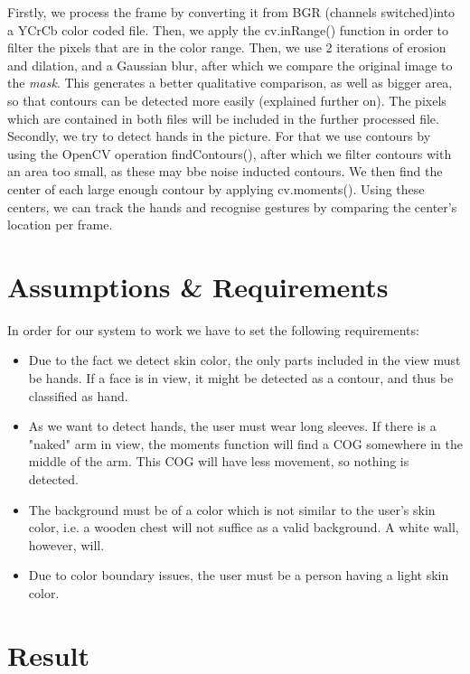 \documentclass[11pt,a4paper]{article}
\begin{document}
Firstly, we process the frame by converting it from BGR (channels switched)into a YCrCb color coded file. Then, we apply the cv.inRange() function in order to filter the pixels that are in the color range. Then, we use 2 iterations of erosion and dilation, and a Gaussian blur, after which we compare the original image to the \emph{mask}. This generates a better qualitative comparison, as well as bigger area, so that contours can be detected more easily (explained further on). The pixels which are contained in both files will be included in the further processed file.\\
\indent Secondly, we try to detect hands in the picture. For that we use contours by using the OpenCV operation findContours(), after which we filter contours with an area too small, as these may bbe noise inducted contours. We then find the center of each large enough contour by applying cv.moments(). Using these centers, we can track the hands and recognise gestures by comparing the center's location per frame.
\section{Assumptions \& Requirements}
In order for our system to work we have to set the following requirements:

\begin{itemize}
\item Due to the fact we detect skin color, the only parts included in the view must be hands. If a face is in view, it might be detected as a contour, and thus be classified as hand.
\item As we want to detect hands, the user must wear long sleeves. If there is a "naked" arm in view, the moments function will find a COG somewhere in the middle of the arm. This COG will have less movement, so nothing is detected.
\item The background must be of a color which is not similar to the user's skin color, i.e. a wooden chest will not suffice as a valid background. A white wall, however, will.
\item Due to color boundary issues, the user must be a person having a light skin color.

\end{itemize}

\section{Result}
\end{document}
